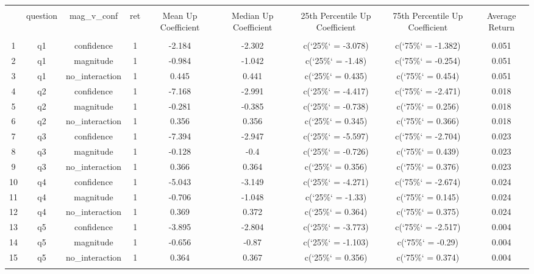 
\begin{table}[!htbp] \centering 
  \caption{} 
  \label{} 
\begin{tabular}{@{\extracolsep{5pt}} ccccccccc} 
\\[-1.8ex]\hline 
\hline \\[-1.8ex] 
 & question & mag\_v\_conf & ret & Mean Up Coefficient & Median Up Coefficient & 25th Percentile Up Coefficient & 75th Percentile Up Coefficient & Average Return \\ 
\hline \\[-1.8ex] 
1 & q1 & confidence & 1 & -2.184 & -2.302 & c(`25\%` = -3.078) & c(`75\%` = -1.382) & 0.051 \\ 
2 & q1 & magnitude & 1 & -0.984 & -1.042 & c(`25\%` = -1.48) & c(`75\%` = -0.254) & 0.051 \\ 
3 & q1 & no\_interaction & 1 & 0.445 & 0.441 & c(`25\%` = 0.435) & c(`75\%` = 0.454) & 0.051 \\ 
4 & q2 & confidence & 1 & -7.168 & -2.991 & c(`25\%` = -4.417) & c(`75\%` = -2.471) & 0.018 \\ 
5 & q2 & magnitude & 1 & -0.281 & -0.385 & c(`25\%` = -0.738) & c(`75\%` = 0.256) & 0.018 \\ 
6 & q2 & no\_interaction & 1 & 0.356 & 0.356 & c(`25\%` = 0.345) & c(`75\%` = 0.366) & 0.018 \\ 
7 & q3 & confidence & 1 & -7.394 & -2.947 & c(`25\%` = -5.597) & c(`75\%` = -2.704) & 0.023 \\ 
8 & q3 & magnitude & 1 & -0.128 & -0.4 & c(`25\%` = -0.726) & c(`75\%` = 0.439) & 0.023 \\ 
9 & q3 & no\_interaction & 1 & 0.366 & 0.364 & c(`25\%` = 0.356) & c(`75\%` = 0.376) & 0.023 \\ 
10 & q4 & confidence & 1 & -5.043 & -3.149 & c(`25\%` = -4.271) & c(`75\%` = -2.674) & 0.024 \\ 
11 & q4 & magnitude & 1 & -0.706 & -1.048 & c(`25\%` = -1.33) & c(`75\%` = 0.145) & 0.024 \\ 
12 & q4 & no\_interaction & 1 & 0.369 & 0.372 & c(`25\%` = 0.364) & c(`75\%` = 0.375) & 0.024 \\ 
13 & q5 & confidence & 1 & -3.895 & -2.804 & c(`25\%` = -3.773) & c(`75\%` = -2.517) & 0.004 \\ 
14 & q5 & magnitude & 1 & -0.656 & -0.87 & c(`25\%` = -1.103) & c(`75\%` = -0.29) & 0.004 \\ 
15 & q5 & no\_interaction & 1 & 0.364 & 0.367 & c(`25\%` = 0.356) & c(`75\%` = 0.374) & 0.004 \\ 
\hline \\[-1.8ex] 
\end{tabular} 
\end{table} 
